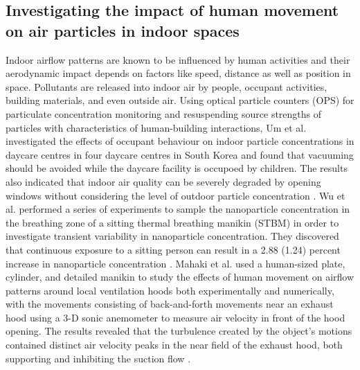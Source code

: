 \documentclass[acmtog]{acmart}
\begin{document}
\subsection{Investigating the impact of human movement on air particles in indoor spaces}
 Indoor airflow patterns are known to be influenced by human activities and their aerodynamic impact depends on factors like speed, distance as well as position in space. Pollutants are released into indoor air by people, occupant activities, building materials, and even outside air. Using optical particle counters (OPS) for particulate concentration monitoring and resuspending source strengths of particles with characteristics of human-building interactions, Um et al. investigated the effects of occupant behaviour on indoor particle concentrations in daycare centres in four daycare centres in South Korea and found that vacuuming should be avoided while the daycare facility is occupoed by children. The results also indicated that indoor air quality can be severely degraded by opening windows without considering the level of outdoor particle concentration \cite{um2022occupant}.  Wu et al. performed a series of experiments to sample the nanoparticle concentration in the breathing zone of a sitting thermal breathing manikin (STBM) in order to investigate transient variability in nanoparticle concentration. They discovered that continuous exposure to a sitting person can result in a 2.88 (1.24) percent increase in nanoparticle concentration \cite{wu2022transient}. Mahaki et al. used a human-sized plate, cylinder, and detailed manikin to study the effects of human movement on airflow patterns around local ventilation hoods both experimentally and numerically, with the movements consisting of back-and-forth movements near an exhaust hood using a 3-D sonic anemometer to measure air velocity in front of the hood opening. The results revealed that the turbulence created by the object's motions contained distinct air velocity peaks in the near field of the exhaust hood, both supporting and inhibiting the suction flow \cite{mahaki2021comparing}.
\end{document}
